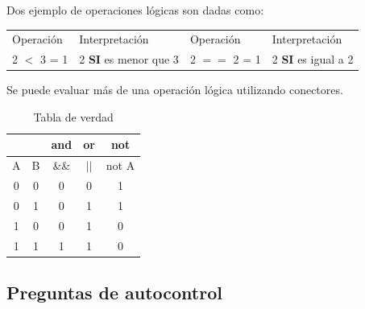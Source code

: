 \documentclass[a4paper,12pt,spanish]{article}
\begin{document}
Dos ejemplo de operaciones lógicas son dadas como:\\
\begin{tabular}[H]{ll||ll}
  Operación & Interpretación & Operación & Interpretación  \\
  2 $<$  3 = 1 & 2 \textbf{SI} es menor que 3 & 2 $==$ 2 = 1 &  2 \textbf{SI} es igual a 2 \\
  
\end{tabular}

Se puede evaluar más de una operación lógica utilizando conectores.
\begin{table}[H]
  \centering
  \begin{tabular}{|c|c|c|c|c|}
    \hline \hline
     & &  and &  or  & not \\ \hline
    A&B& \&\& & $||$ & not A \\ \hline \hline
    0&0&  0   &  0   &  1  \\  \hline
    0&1&  0   &  1   &  1  \\  \hline
    1&0&  0   &  1   &  0  \\  \hline
    1&1&  1   &  1   &  0  \\  \hline

  \end{tabular}
  \caption{Tabla de verdad}
  \label{tab:tverdad}
\end{table}



\newpage
\subsection{Preguntas de autocontrol}
\label{sec:preg-de-autoc-3}
\end{document}
